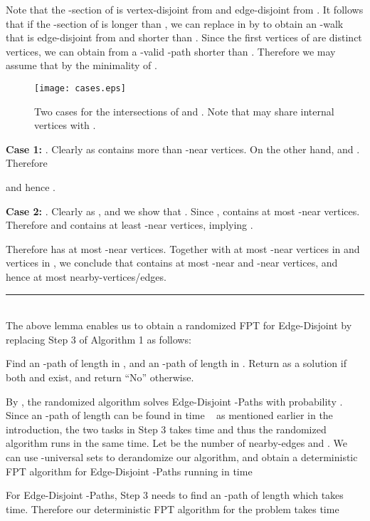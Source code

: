 \documentclass{llncs}
\def\qed{\rule{1.5mm}{3mm}}
\begin{document}
{	Note that the -section  of  is vertex-disjoint from  and 
	edge-disjoint from . 
	It follows that if the -section  of  is longer
	than , we can replace  in  by  to obtain an 
	-walk  that is edge-disjoint from  and shorter than .
	Since the first  vertices of  are distinct vertices, we can obtain from 
	a -valid -path shorter than .
	Therefore we may assume that  by the minimality of .
	
	\begin{figure}[hbt]
		\centerline{
			\texttt{[image: cases.eps]}
		}
		\caption{Two cases for the intersections of  and . Note that  may share internal vertices with . }
		\label{fig:cases}
	\end{figure}
	
	{\bf Case 1:} .
	Clearly  as  contains 
	more than  -near vertices.
	On the other hand,  and .
	Therefore  
	
	and hence . 
	
	{\bf Case 2:} .
	Clearly  as ,
	and we show that .  
	Since ,  contains at most  -near vertices.
	Therefore  and  contains at least  -near vertices,
	implying .
	
	Therefore  has at most  -near vertices.
	Together with at most  -near vertices in  and  vertices in ,
	we conclude that  contains at most  -near and -near vertices,
	and hence at most  nearby-vertices/edges.
	\qed} \\


The above lemma enables us to obtain a randomized FPT for {\sc Edge-Disjoint } 
by replacing Step 3 of Algorithm 1 as follows:

 Find an -path  of length  in , and an
-path  of length  in .
Return  as a solution if both  and  exist,
and return ``No'' otherwise.

By , the randomized algorithm solves {\sc Edge-Disjoint -Paths}
with probability .  
Since an -path  of length  can be found in time ~\cite{fomin2014efficient} as mentioned earlier in the introduction, 
the two tasks in Step 3 takes  time and thus 
the randomized algorithm runs in the same time. 
Let  be the number of nearby-edges and .
We can use -universal sets to derandomize our algorithm, and obtain
a deterministic FPT algorithm for {\sc Edge-Disjoint -Paths} running in time


For {\sc Edge-Disjoint -Paths}, Step 3 needs to find
an -path  of length  which takes  time.
Therefore our deterministic FPT algorithm for the problem takes time
\end{document}
